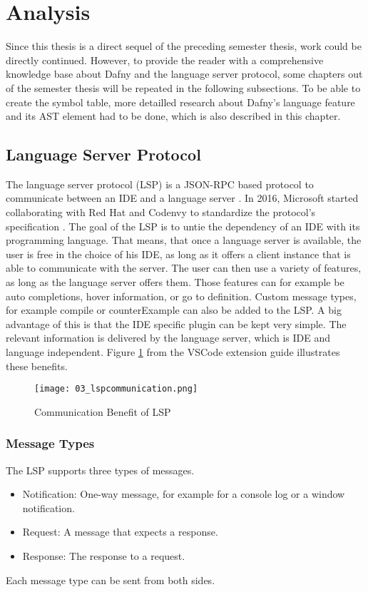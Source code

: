 \section{Analysis}
\label{section:analysis}
Since this thesis is a direct sequel of the preceding semester thesis, work could be directly continued. However, to provide the reader with a comprehensive knowledge base about Dafny and the language server protocol, some chapters out of the semester thesis will be repeated in the following subsections. To be able to create the symbol table, more detailled research about Dafny's language feature and its AST element had to be done, which is also described in this chapter.

\subsection{Language Server Protocol}
\label{section:analysis:lsp}
The language server protocol (LSP) is a JSON-RPC based protocol to communicate between an IDE and a language server \cite{dafnyWiki}. In 2016, Microsoft started collaborating with Red Hat and Codenvy to standardize the protocol’s specification \cite{dafnyWiki}. The goal of the LSP is to untie the dependency of an IDE with its programming language. That means, that once a language server is available, the user is free in the choice of his IDE, as long as it offers a client instance that is able to communicate with the server. The user can then use a variety of features, as long as the language server offers them. Those features can for example be auto completions, hover information, or go to definition. Custom message types, for example compile or counterExample can also be added to the LSP. \cite{dafnyWiki}
A big advantage of this is that the IDE specific plugin can be kept very simple. The relevant information is delivered by the language server, which is IDE and language independent. Figure \ref{fig:lspcommunication} from the VSCode extension guide illustrates these benefits. \cite{lspextensionguide}

\begin{figure}[h]
    \centering
    \texttt{[image: 03\_lspcommunication.png]}
    \caption{Communication Benefit of LSP}
    \label{fig:lspcommunication}
\end{figure}

\subsubsection{Message Types}
The LSP supports three types of messages.
\begin{itemize}
    \item Notification: One-way message, for example for a console log or a window notification.
    \item Request: A message that expects a response.
    \item Response: The response to a request.
\end{itemize}
Each message type can be sent from both sides.


